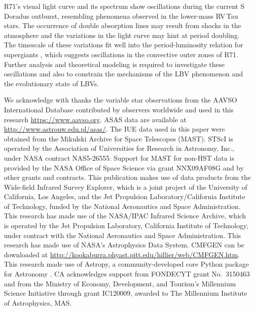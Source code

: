\documentclass[structabstract]{aa}
\begin{document}
R71's visual light curve and its spectrum show oscillations during the current S\,Doradus outburst, resembling phenomena observed in the lower-mass RV\,Tau stars. The occurrence of double absorption lines may result from shocks in the atmosphere and the variations in the light curve may hint at period doubling.
The timescale of these variations fit well into the period-luminosity relation for supergiants \citep{1980A&A....90..311M}, which suggests oscillations in the convective outer zones of R71.
Further analysis and theoretical modeling is required to investigate these oscillations and also to constrain the mechanisms of the LBV phenomenon and the evolutionary state of LBVs. 


\begin{acknowledgements} We acknowledge with thanks the variable star observations from the AAVSO International Database contributed by observers worldwide and used in this research \url{https://www.aavso.org}. ASAS data are available at \url{http://www.astrouw.edu.pl/asas/}.
The IUE data used in this paper were obtained from the Mikulski Archive for Space Telescopes (MAST). STScI is operated by the Association of Universities for Research in Astronomy, Inc., under NASA contract NAS5-26555. Support for MAST for non-HST data is provided by the NASA Office of Space Science via grant NNX09AF08G and by other grants and contracts. This publication makes use of data products from the Wide-field Infrared Survey Explorer, which is a joint project of the University of California, Los Angeles, and the Jet Propulsion Laboratory/California Institute of Technology, funded by the National Aeronautics and Space Administration. This research has made use of the NASA/IPAC Infrared Science Archive, which is operated by the Jet Propulsion Laboratory, California Institute of Technology, under contract with the National Aeronautics and Space Administration. This research has made use of NASA's Astrophysics Data System. CMFGEN can be downloaded at \url{http://kookaburra.phyast.pitt.edu/hillier/web/CMFGEN.htm}.  This research made use of Astropy, a community-developed core Python package
  for Astronomy \citep{2013A&A...558A..33A}. CA acknowledges support from FONDECYT grant No.\ 3150463 and from the Ministry of
Economy, Development, and Tourism's Millennium Science Initiative through grant IC120009, awarded to The Millennium Institute
of Astrophysics, MAS.
\end{acknowledgements}



\end{document}
